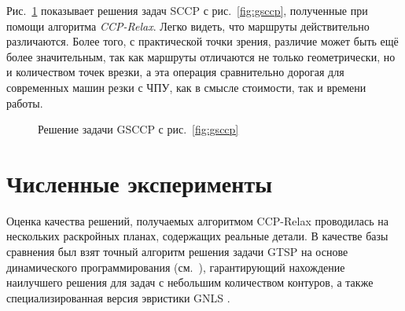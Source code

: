 \documentclass[10pt]{SPIIRAS_Proceedings}
\begin{document}
Рис.~\ref{fig:gsccp-cut}
показывает решения задач SCCP
с рис.~\ref{fig:gsccp},
полученные при помощи алгоритма
{\it CCP-Relax}.
Легко видеть,
что маршруты действительно различаются.
Более того,
с практической точки зрения,
различие может быть ещё более значительным,
так как маршруты отличаются не только
геометрически,
но и количеством точек врезки,
а эта операция сравнительно дорогая
для современных машин резки с ЧПУ,
как в смысле стоимости,
так и времени работы.

\begin{figure}
  \centering
  \caption{Решение задачи GSCCP с рис.~\ref{fig:gsccp}}
  \label{fig:gsccp-cut}
\end{figure}

\section{Численные эксперименты}
\label{sec:calc}

Оценка качества решений,
получаемых алгоритмом CCP-Relax
проводилась на нескольких раскройных планах,
содержащих реальные детали.
В качестве базы сравнения
был взят точный алгоритм
решения задачи GTSP на основе динамического программирования
(см.~\cite{bi15}),
гарантирующий нахождение
наилучшего решения для задач
с небольшим количеством контуров,
а также специализированная версия эвристики
GNLS \cite{GLNS}.
\end{document}
